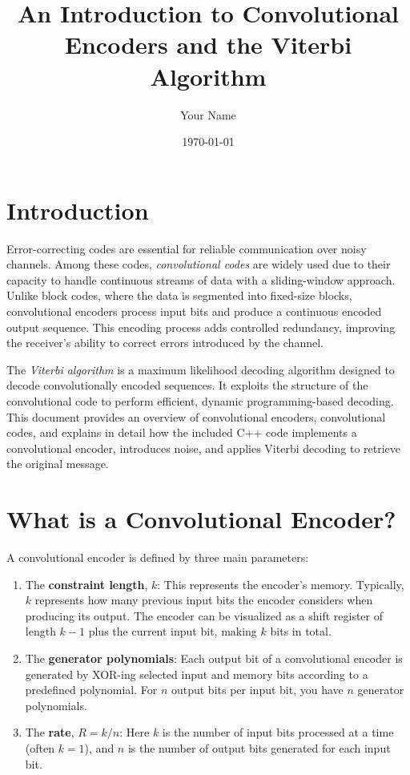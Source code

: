 \documentclass[12pt,a4paper]{article}
\title{An Introduction to Convolutional Encoders and the Viterbi Algorithm}
\author{Your Name}
\date{\today}
\begin{document}
\maketitle

\tableofcontents

\section{Introduction}

Error-correcting codes are essential for reliable communication over noisy channels. Among these codes, \emph{convolutional codes} are widely used due to their capacity to handle continuous streams of data with a sliding-window approach. Unlike block codes, where the data is segmented into fixed-size blocks, convolutional encoders process input bits and produce a continuous encoded output sequence. This encoding process adds controlled redundancy, improving the receiver's ability to correct errors introduced by the channel.

The \emph{Viterbi algorithm} is a maximum likelihood decoding algorithm designed to decode convolutionally encoded sequences. It exploits the structure of the convolutional code to perform efficient, dynamic programming-based decoding. This document provides an overview of convolutional encoders, convolutional codes, and explains in detail how the included C++ code implements a convolutional encoder, introduces noise, and applies Viterbi decoding to retrieve the original message.

\section{What is a Convolutional Encoder?}

A convolutional encoder is defined by three main parameters:
\begin{enumerate}
    \item The \textbf{constraint length}, $k$: This represents the encoder's memory. Typically, $k$ represents how many previous input bits the encoder considers when producing its output. The encoder can be visualized as a shift register of length $k-1$ plus the current input bit, making $k$ bits in total.
    \item The \textbf{generator polynomials}: Each output bit of a convolutional encoder is generated by XOR-ing selected input and memory bits according to a predefined polynomial. For $n$ output bits per input bit, you have $n$ generator polynomials.
    \item The \textbf{rate}, $R = k/n$: Here $k$ is the number of input bits processed at a time (often $k=1$), and $n$ is the number of output bits generated for each input bit.
\end{enumerate}
\end{document}
